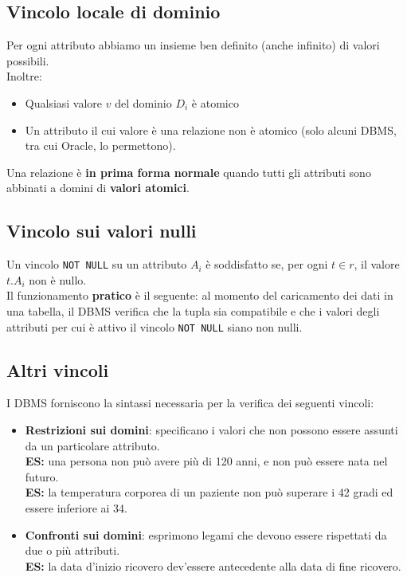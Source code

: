 \subsection{Vincolo locale di dominio}
Per ogni attributo abbiamo un insieme ben definito (anche infinito) di valori possibili.\\
Inoltre:
\begin{itemize}
    \item{Qualsiasi valore $v$ del dominio $D_i$ è atomico}
    \item{Un attributo il cui valore è una relazione non è atomico (solo alcuni DBMS, tra cui Oracle, lo permettono).}
\end{itemize}
Una relazione è \textbf{in prima forma normale} quando tutti gli attributi sono abbinati a domini di \textbf{valori atomici}.

\subsection{Vincolo sui valori nulli}
Un vincolo \texttt{NOT NULL} su un attributo $A_i$ è soddisfatto se, per ogni $t \in r$, il valore $t.A_i$ non è nullo.\\
Il funzionamento \textbf{pratico} è il seguente: al momento del caricamento dei dati in una tabella, il DBMS verifica che la tupla sia compatibile e che i valori degli attributi per cui è attivo il vincolo \texttt{NOT NULL} siano non nulli.

\subsection{Altri vincoli}
I DBMS forniscono la sintassi necessaria per la verifica dei seguenti vincoli:
    \begin{itemize}
        \item{\textbf{Restrizioni sui domini}: specificano i valori che non possono essere assunti da un particolare attributo.\\
            \textbf{ES:} una persona non può avere più di 120 anni, e non può essere nata nel futuro.\\
            \textbf{ES:} la temperatura corporea di un paziente non può superare i 42 gradi ed essere inferiore ai 34.}
        \item{\textbf{Confronti sui domini}: esprimono legami che devono essere rispettati da due o più attributi.\\
            \textbf{ES:} la data d'inizio ricovero dev'essere antecedente alla data di fine ricovero.}
    \end{itemize}

